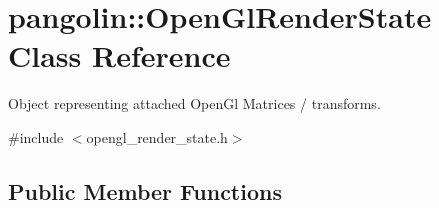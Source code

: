 \hypertarget{classpangolin_1_1_open_gl_render_state}{}\section{pangolin\+:\+:Open\+Gl\+Render\+State Class Reference}
\label{classpangolin_1_1_open_gl_render_state}


Object representing attached Open\+Gl Matrices / transforms.  




{\ttfamily \#include $<$opengl\+\_\+render\+\_\+state.\+h$>$}

\subsection*{Public Member Functions}
